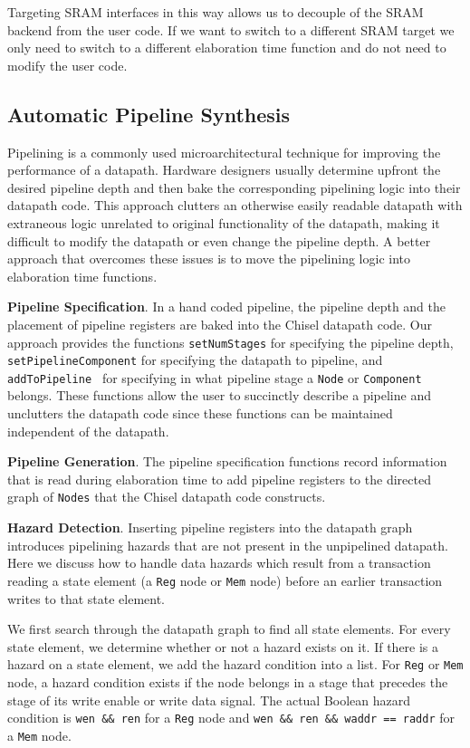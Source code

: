 Targeting SRAM interfaces in this way allows us to decouple of the
SRAM backend from the user code. If we want to switch to a different
SRAM target we only need to switch to a different elaboration time
function and do not need to modify the user code.

\subsection{Automatic Pipeline Synthesis}
Pipelining is a commonly used microarchitectural technique for
improving the performance of a datapath. Hardware designers usually
determine upfront the desired pipeline depth and then bake the
corresponding pipelining logic into their datapath code. This approach
clutters an otherwise easily readable datapath with extraneous logic
unrelated to original functionality of the datapath, making it
difficult to modify the datapath or even change the pipeline depth. A
better approach that overcomes these issues is to move the pipelining
logic into elaboration time functions.

{\bf Pipeline Specification}. In a hand coded pipeline, the pipeline
depth and the placement of pipeline registers are baked into the
Chisel datapath code. Our approach provides the functions 
{\tt setNumStages} for specifying the pipeline depth, 
{\tt setPipelineComponent} for specifying the datapath to pipeline,
and {\tt addToPipeline } for specifying in what pipeline stage a {\tt Node}
or {\tt Component} belongs. These functions allow the user to
succinctly describe a pipeline and unclutters the datapath code since
these functions can be maintained independent of the datapath.

{\bf Pipeline Generation}. The pipeline specification functions record
information that is read during elaboration time to add pipeline
registers to the directed graph of {\tt Nodes} that the Chisel datapath
code constructs.

{\bf Hazard Detection}. Inserting pipeline registers into the datapath
graph introduces pipelining hazards that are not present in the
unpipelined datapath. Here we discuss how to handle data hazards which
result from a transaction reading a state element (a {\tt Reg} node or
{\tt Mem} node) before an earlier transaction writes to that state
element. 

We first search through the datapath graph to find all state
elements. For every state element, we determine whether or not a
hazard exists on it. If there is a hazard on a state element, we add
the hazard condition into a list. For {\tt Reg} or {\tt Mem} node, a
hazard condition exists if the node belongs in a stage that precedes the
stage of its write enable or write data signal. The actual Boolean
hazard condition is {\tt wen \&\& ren} for a {\tt Reg} node and
{\tt wen \&\& ren \&\& waddr == raddr} for a {\tt Mem} node.


